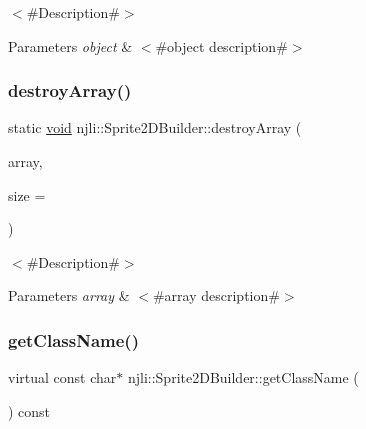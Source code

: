 $<$\#\+Description\#$>$


\begin{DoxyParams}{Parameters}
{\em object} & $<$\#object description\#$>$ \\
\hline
\end{DoxyParams}
\mbox{\label{classnjli_1_1_sprite2_d_builder_a7b2e0f8407cf1456c5d67c76b5f44b45}} 
\subsubsection{\texorpdfstring{destroy\+Array()}{destroyArray()}}
{\footnotesize\ttfamily static \mbox{\hyperlink{_thread_8h_af1e856da2e658414cb2456cb6f7ebc66}{void}} njli\+::\+Sprite2\+D\+Builder\+::destroy\+Array (\begin{DoxyParamCaption}\item[{\mbox{\hyperlink{classnjli_1_1_sprite2_d_builder}{Sprite2\+D\+Builder}} $\ast$$\ast$}]{array,  }\item[{const \mbox{\hyperlink{_util_8h_a10e94b422ef0c20dcdec20d31a1f5049}{u32}}}]{size = {} }\end{DoxyParamCaption})\hspace{0.3cm}{\ttfamily [static]}}

$<$\#\+Description\#$>$


\begin{DoxyParams}{Parameters}
{\em array} & $<$\#array description\#$>$ \\
\hline
\end{DoxyParams}
\mbox{\label{classnjli_1_1_sprite2_d_builder_ac8758df00e11e876e1181a325dd072f5}} 
\subsubsection{\texorpdfstring{get\+Class\+Name()}{getClassName()}}
{\footnotesize\ttfamily virtual const char$\ast$ njli\+::\+Sprite2\+D\+Builder\+::get\+Class\+Name (\begin{DoxyParamCaption}{ }\end{DoxyParamCaption}) const\hspace{0.3cm}{\ttfamily [virtual]}}

